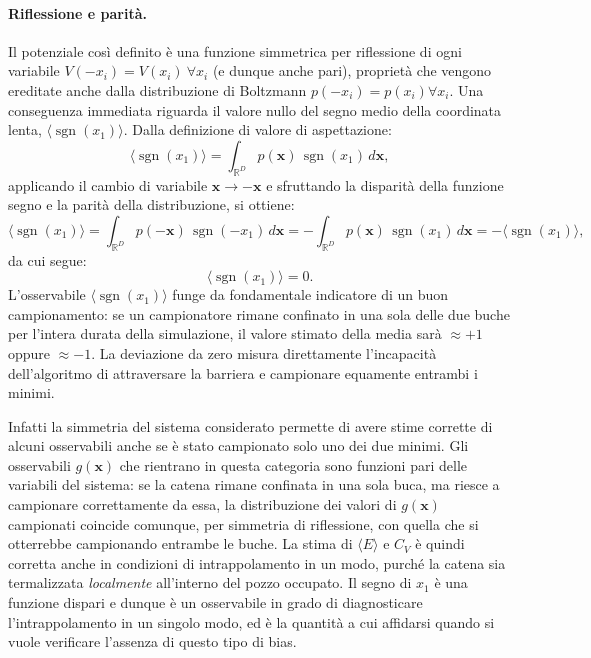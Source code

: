 \paragraph*{Riflessione e parità.}
Il potenziale così definito è una funzione simmetrica per riflessione di ogni variabile $V(-x_i) = V(x_i) \ \forall x_i$ (e dunque anche pari), proprietà che vengono ereditate anche dalla distribuzione di Boltzmann $p(-x_i) = p(x_i) \forall x_i$. Una conseguenza immediata riguarda il valore nullo del segno medio della coordinata lenta, $\langle \operatorname{sgn}(x_1) \rangle$. Dalla definizione di valore di aspettazione:
\begin{equation}
    \langle \operatorname{sgn}(x_1) \rangle = \int_{\mathbb{R}^D} p(\mathbf{x}) \, \operatorname{sgn}(x_1) \, d\mathbf{x},
\end{equation}
applicando il cambio di variabile $\mathbf{x} \to -\mathbf{x}$ e sfruttando la disparità della funzione segno e la parità della distribuzione, si ottiene:
\begin{equation}
    \langle \operatorname{sgn}(x_1) \rangle = \int_{\mathbb{R}^D} p(-\mathbf{x}) \, \operatorname{sgn}(-x_1) \, d\mathbf{x} = -\int_{\mathbb{R}^D} p(\mathbf{x}) \, \operatorname{sgn}(x_1) \, d\mathbf{x} = -\langle \operatorname{sgn}(x_1) \rangle,
\end{equation}
da cui segue:
\begin{equation}
    \langle \operatorname{sgn}(x_1) \rangle = 0.
    \label{eq:sgn_zero}
\end{equation}
L'osservabile $\langle \operatorname{sgn}(x_1) \rangle$ funge da fondamentale indicatore di un buon campionamento: se un campionatore rimane confinato in una sola delle due buche per l'intera durata della simulazione, il valore stimato della media sarà $\approx +1$ oppure $\approx -1$. La deviazione da zero misura direttamente l'incapacità dell'algoritmo di attraversare la barriera e campionare equamente entrambi i minimi. 

Infatti la simmetria del sistema considerato permette di avere stime corrette di alcuni osservabili anche se è stato campionato solo uno dei due minimi. Gli osservabili $g(\mathbf{x})$ che rientrano in questa categoria sono funzioni pari delle variabili del sistema: se la catena rimane confinata in una sola buca, ma riesce a campionare correttamente da essa, la distribuzione dei valori di $g(\mathbf{x})$ campionati coincide comunque, per simmetria di riflessione, con quella che si otterrebbe campionando entrambe le buche. La stima di $\langle E\rangle$ e $C_V$ è quindi corretta anche in condizioni di intrappolamento in un modo, purché la catena sia termalizzata \emph{localmente} all'interno del pozzo occupato. Il segno di $x_1$ è una funzione dispari e dunque è un osservabile in grado di diagnosticare l'intrappolamento in un singolo modo, ed è la quantità a cui affidarsi quando si vuole verificare l'assenza di questo tipo di bias.

